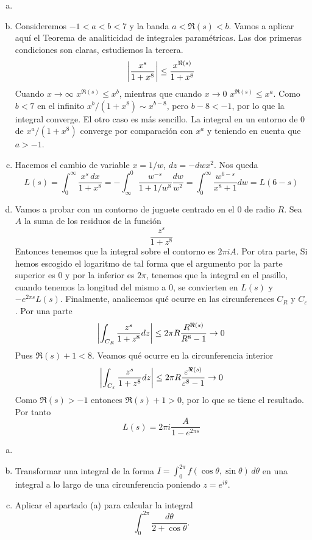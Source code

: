 \documentclass[twoside]{article}
\begin{document}
\begin{solucion}
\begin{enumerate}[a)]
\item[]
\item Consideremos $-1<a<b<7$ y la banda $a<\Re(s)<b$. Vamos a aplicar aquí el Teorema de analiticidad de integrales paramétricas. Las dos primeras condiciones son claras, estudiemos la tercera.
$$
\left\lvert\frac{x^s}{1+x^8}\right\rvert \leq \frac{x^{\Re(s)}}{1+x^8}
$$
Cuando $x\to \infty$ $x^{\Re(s)}\leq x^b$, mientras que cuando $x\to 0$ $x^{\Re(s)}\leq x^a$. Como $b<7$ en el infinito $x^b/(1+x^8) \sim x^{b-8}$, pero $b-8<-1$, por lo que la integral converge. El otro caso es más sencillo. La integral en un entorno de $0$ de $x^a/(1+x^8)$ converge por comparación con $x^a$ y teniendo en cuenta que $a>-1$.
\item Hacemos el cambio de variable $x = 1/w$, $dz = -dw x^2$. Nos queda
$$
L(s)=\int_0^\infty \frac{x^s\,dx}{1+x^8} = -\int_\infty^0 \frac{w^{-s}}{1+1/w^8}\frac{dw}{w^2}= \int_0^\infty \frac{w^{6-s}}{x^8+1}dw = L(6-s)
$$
\item Vamos a probar con un contorno de juguete centrado en el 0 de radio $R$. Sea $A$ la suma de los residuos de la función
$$
\frac{z^s}{1+z^8}
$$
Entonces tenemos que la integral sobre el contorno es $2\pi i A$. Por otra parte, Si hemos escogido el logaritmo de tal forma que el argumento por la parte superior es $0$ y por la inferior es $2\pi$, tenemos que la integral en el pasillo, cuando tenemos la longitud del mismo a $0$, se convierten en $L(s)$ y $-e^{2\pi s}L(s)$. Finalmente, analicemos qué ocurre en las circunferences $C_R$ y $C_\varepsilon$. Por una parte
$$
\left\lvert\int_{C_R}\frac{z^s}{1+z^8}dz\right\rvert \leq 2\pi R \frac{R^{\Re(s)}}{R^8-1} \to 0
$$
Pues $\Re(s)+1 < 8$. Veamos qué ocurre en la circunferencia interior
$$
\left\lvert\int_{C_\varepsilon}\frac{z^s}{1+z^8}dz\right\rvert \leq 2\pi R \frac{\varepsilon^{\Re(s)}}{\varepsilon^8-1} \to 0
$$
Como $\Re(s)>-1$ entonces $\Re(s)+1>0$, por lo que se tiene el resultado. Por tanto
$$
L(s) = 2\pi i \frac{A}{1-e^{2\pi s}}
$$
\end{enumerate}
\end{solucion}
\newpage
\begin{ejercicio}{8}
\begin{enumerate}[a)]
\item[]
\item Transformar una integral de la forma $I=\int_0^{2\pi} f(\cos\theta,\sin\theta)\,d\theta$ 
en una integral a lo largo de una circunferencia poniendo $z=e^{i\theta}$. 
\item Aplicar el apartado (a) para calcular la integral
\[\int_0^{2\pi}\frac{d\theta}{2+\cos\theta}.\]
\end{enumerate}
\end{ejercicio}
\end{document}
